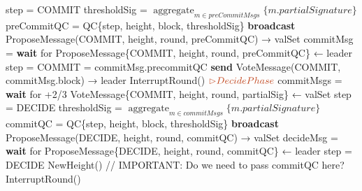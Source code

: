 \documentclass[a4paper]{article}
\DeclareMathOperator*{\aggregate}{aggregate}
\begin{document}
\begin{algorithm}
\begin{algorithmic}[1]
          \State step = COMMIT
          \State thresholdSig = ${\aggregate_{m \in preCommitMsgs} \{m.partialSignature\}}$
          \State preCommitQC = QC\{step, height, block, thresholdSig\}
          \State \textbf{broadcast} ProposeMessage(COMMIT, height, round, preCommitQC) → valSet
        \Else \quad {\color{Gray} { // IsReplica}}
          \State commitMsg = \textbf{wait} for ProposeMessage\{COMMIT, height, round, preCommitQC\} ← leader
          \State step = COMMIT
             = commitMsg.precommitQC
            \State \textbf{send} VoteMessage(COMMIT, commitMsg.block) → leader
          \Else
            \State InterruptRound()
          \EndIf
        \EndIf
        \State
        \newline ${\color{Bittersweet} {\rhd Decide Phase}}$
          \State commitMsgs = \textbf{wait} for {+2/3} VoteMessage\{\textsc{COMMIT}, height, round, partialSig\} ← valSet
          \State step = DECIDE
          \State thresholdSig = ${\aggregate_{m \in commitMsgs} \{m.partialSignature\}}$
          \State commitQC = QC\{step, height, block, thresholdSig\}
          \State \textbf{broadcast} ProposeMessage(DECIDE, height, round, commitQC) → valSet
        \Else \quad {\color{Gray} { // IsReplica}}
            \State decideMsg = \textbf{wait} for ProposeMessage\{DECIDE, height, round, commitQC\} ← leader
            \State step = DECIDE
                \State NewHeight() {\color{Red} // IMPORTANT: Do we need to pass commitQC here?}
            \Else
                \State InterruptRound()
          \EndIf
        \EndIf
      \EndFor
      \State
  \end{algorithmic}
\end{algorithm}
\end{document}
